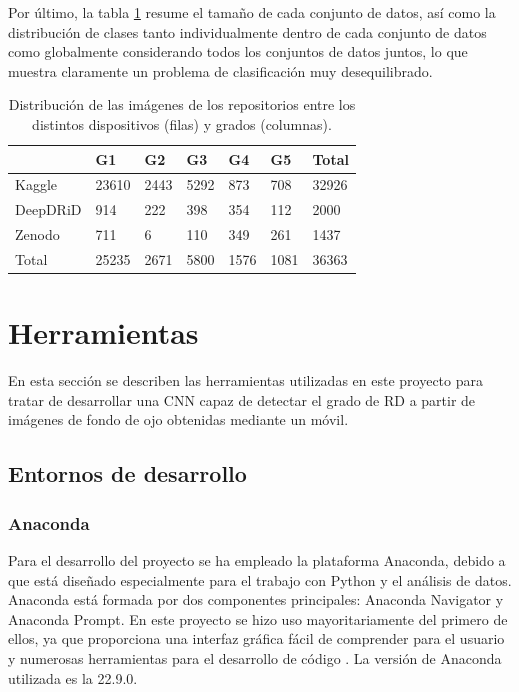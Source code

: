 Por último, la tabla \ref{tab:repositorios} resume el tamaño de cada conjunto de datos, así como la distribución de clases tanto individualmente dentro de cada conjunto de datos como globalmente considerando todos los conjuntos de datos juntos, lo que muestra claramente un problema de clasificación muy desequilibrado.

\begin{table}[]
\centering
\begin{tabular}{@{}llllll|l@{}}
         & G1    & G2   & G3   & G4   & G5   & Total \\ \midrule
Kaggle   & 23610 & 2443 & 5292 & 873  & 708  & 32926 \\
DeepDRiD & 914   & 222  & 398  & 354  & 112  & 2000  \\
Zenodo   & 711   & 6    & 110  & 349  & 261  & 1437  \\ \midrule
Total    & 25235 & 2671 & 5800 & 1576 & 1081 & 36363
\end{tabular}
\caption{Distribución de las imágenes de los repositorios entre los distintos dispositivos (filas) y grados (columnas).}
\label{tab:repositorios}
\end{table}

\titlespacing{\section}{0pt}{0.25cm}{0.15cm}
\section{Herramientas}

En esta sección se describen las herramientas utilizadas en este proyecto para tratar de desarrollar una CNN capaz de detectar el grado de RD a partir de imágenes de fondo de ojo obtenidas mediante un móvil.

\subsection{Entornos de desarrollo}

\subsubsection{Anaconda}

Para el desarrollo del proyecto se ha empleado la plataforma Anaconda, debido a que está diseñado especialmente para el trabajo con Python y el análisis de datos. Anaconda está formada por dos componentes principales: Anaconda Navigator y Anaconda Prompt. En este proyecto se hizo uso mayoritariamente del primero de ellos, ya que proporciona una interfaz gráfica fácil de comprender para el usuario y numerosas herramientas para el desarrollo de código \cite{met:anaconda}. La versión de Anaconda utilizada es la 22.9.0.

